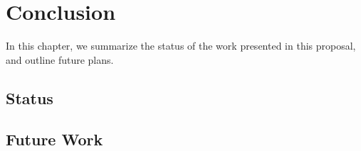 \chapter{Conclusion}
\label{chap:conclusion}

In this chapter, we summarize the status of the work presented in this proposal, and outline future plans.

\section{Status}
\label{sec:conclusion:status}

\section{Future Work}
\label{sec:conclusion:future-work}


